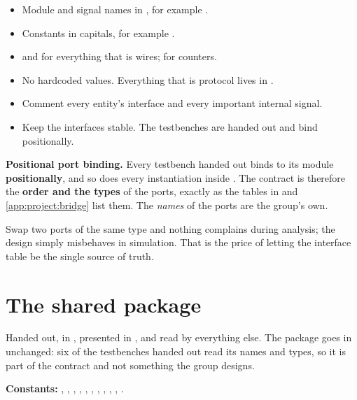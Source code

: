 \begin{itemize}
  \item Module and signal names in , for example .
  \item Constants in capitals, for example .
  \item {} and  for everything that is wires; 
    for counters.
  \item No hardcoded values. Everything that is protocol lives in .
  \item Comment every entity's interface and every important internal signal.
  \item Keep the interfaces stable. The testbenches are handed out and bind positionally.
\end{itemize}

\begin{warning}
\textbf{Positional port binding.} Every testbench handed out binds to its module
\textbf{positionally}, and so does every instantiation inside . The contract is
therefore the \textbf{order and the types} of the ports, exactly as the tables in
 and \ref{app:project:bridge} list them. The \emph{names} of the ports
are the group's own.

Swap two ports of the same type and nothing complains during analysis; the design simply misbehaves
in simulation. That is the price of letting the interface table be the single source of truth.
\end{warning}

\section{The shared package }
\label{app:project:candef}

Handed out, in , presented in , and read by everything
else. The package goes in unchanged: six of the testbenches handed out read its names and types, so
it is part of the contract and not something the group designs.

\textbf{Constants:} , , ,
, , , , ,
, , .

